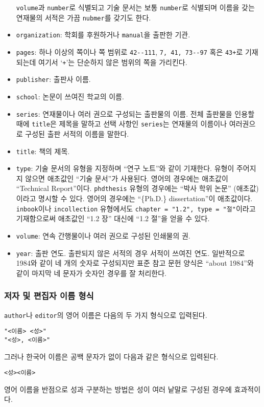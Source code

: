 \begin{itemize}
  \texttt{volume}과 \texttt{number}로 식별되고 기술 문서는 보통
  \texttt{number}로 식별되며 이름을 갖는 연재물의 서적은 가끔
  \texttt{nubmer}를 갖기도 한다.
\item \texttt{organization}: 학회를 후원하거나 \texttt{manual}을
  출판한 기관.
\item \texttt{pages}: 하나 이상의 쪽이나 쪽 범위로
  \texttt{42{-}{-}111}, \texttt{7, 41, 73{-}{-}97} 혹은 \texttt{43+}로
  기재되는데 여기서 `\texttt{+}'는 단순하지 않은 범위의 쪽을 가리킨다.
\item \texttt{publisher}: 출판사 이름.
\item \texttt{school}: 논문이 쓰여진 학교의 이름.
\item \texttt{series}: 연재물이나 여러 권으로 구성되는 출판물의 이름.
  전체 출판물을 인용할 때에 \texttt{title}은 제목을 말하고 선택 사항인
  \texttt{series}는 연재물의 이름이나 여러권으로 구성된 출판 서적의
  이름을 말한다.
\item \texttt{title}: 책의 제목.
\item \texttt{type}: 기술 문서의 유형을 지정하며 ``연구 노트''와 같이
  기재한다.  유형이 주어지지 않으면 애초값인 ``기술 문서''가 사용된다.
  영어의 경우에는 애초값이 ``Technical Report''이다.
  \texttt{phdthesis} 유형의 경우에는 ``박사 학위 논문'' (애초값)이라고
  명시할 수 있다. 영어의 경우에는 ``\{Ph.D.\} dissertation''이
  애초값이다.  \texttt{inbook}이나 \texttt{incollection} 유형에서도
  \texttt{chapter = "1.2", type = "절"}이라고 기재함으로써 애초값인
  ``1.2 장'' 대신에 ``1.2 절''을 얻을 수 있다.
\item \texttt{volume}: 연속 간행물이나 여러 권으로 구성된 인쇄물의 권.
\item \texttt{year}: 출판 연도.  출판되지 않은 서적의 경우 서적이
  쓰여진 연도.  일반적으로 1984와 같이 네 개의 숫자로 구성되지만 표준
  참고 문헌 양식은 ``about 1984''와 같이 마지막 네 문자가 숫자인 경우를
  잘 처리한다.
\end{itemize}


\subsubsection{저자 및 편집자 이름 형식}
\label{sec:name}

\texttt{author}나 \texttt{editor}의 영어 이름은 다음의 두 가지 형식으로
입력된다.
\begin{verbatim}
"<이름> <성>"
"<성>, <이름>"
\end{verbatim}
그러나 한국어 이름은 공백 문자가 없이 다음과 같은 형식으로 입력된다.
\begin{verbatim}
<성><이름>
\end{verbatim}
영어 이름을 반점으로 성과 구분하는 방법은 성이 여러 낱말로 구성된
경우에 효과적이다.

